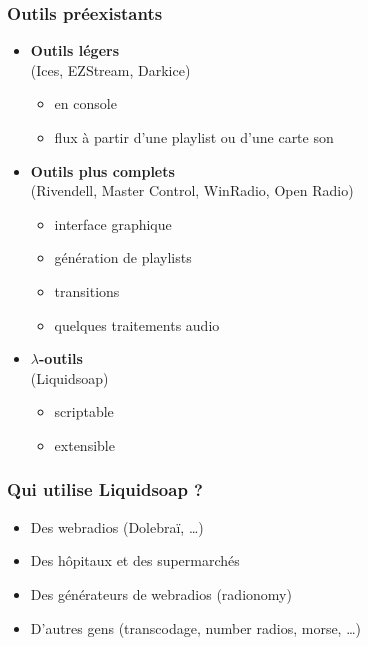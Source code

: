 \documentclass{beamer}
\begin{document}
\begin{frame}
  \frametitle{Outils préexistants}

  \begin{itemize}
  \item \textbf{Outils légers}\\
    (Ices, EZStream, Darkice)
    \begin{itemize}
    \item en console
    \item flux à partir d'une playlist ou d'une carte son
    \end{itemize}
  \item<2-> \textbf{Outils plus complets}\\
    (Rivendell, Master Control, WinRadio, Open Radio)
    \begin{itemize}
    \item interface graphique
    \item génération de playlists
    \item transitions
    \item quelques traitements audio
    \end{itemize}
  \item<3-> \textbf{$\lambda$-outils}\\
    (Liquidsoap)
    \begin{itemize}
    \item scriptable
    \item extensible
    \end{itemize}
  \end{itemize}
\end{frame}

\begin{frame}
  \frametitle{Qui utilise Liquidsoap ?}

  \begin{itemize}
  \item Des webradios (Dolebraï, \ldots)
  \item Des hôpitaux et des supermarchés
  \item Des générateurs de webradios (radionomy)
  \item D'autres gens (transcodage, number radios, morse, \ldots)
  \end{itemize}
\end{frame}
\end{document}
